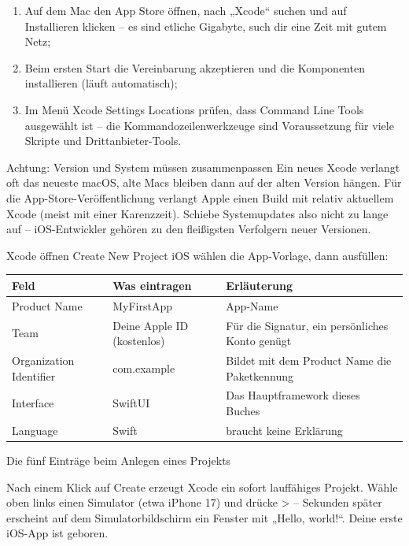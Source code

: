 \begin{enumerate}
  \item Auf dem Mac den App Store öffnen, nach „Xcode“ suchen und auf Installieren klicken – es sind etliche Gigabyte, such dir eine Zeit mit gutem Netz;
  \item Beim ersten Start die Vereinbarung akzeptieren und die Komponenten installieren (läuft automatisch);
  \item Im Menü Xcode Settings Locations prüfen, dass Command Line Tools ausgewählt ist – die Kommandozeilenwerkzeuge sind Voraussetzung für viele Skripte und Drittanbieter-Tools.
\end{enumerate}

\begin{tcbwarn}{Achtung: Version und System müssen zusammenpassen}
Ein neues Xcode verlangt oft das neueste macOS, alte Macs bleiben dann auf der alten Version hängen. Für die App-Store-Veröffentlichung verlangt Apple einen Build mit relativ aktuellem Xcode (meist mit einer Karenzzeit). Schiebe Systemupdates also nicht zu lange auf – iOS-Entwickler gehören zu den fleißigsten Verfolgern neuer Versionen.

\end{tcbwarn}


Xcode öffnen Create New Project iOS wählen die App-Vorlage, dann ausfüllen:

\begin{center}
\begin{tabularx}{\linewidth}{|X|X|X|}
\hline
\textbf{Feld} & \textbf{Was eintragen} & \textbf{Erläuterung} \tabularnewline
\hline
Product Name & MyFirstApp & App-Name \tabularnewline
Team & Deine Apple ID (kostenlos) & Für die Signatur, ein persönliches Konto genügt \tabularnewline
Organization Identifier & com.example & Bildet mit dem Product Name die Paketkennung \tabularnewline
Interface & SwiftUI & Das Hauptframework dieses Buches \tabularnewline
Language & Swift & braucht keine Erklärung \tabularnewline
\hline
\end{tabularx}
\end{center}

\begin{center}\small\color{gray}Die fünf Einträge beim Anlegen eines Projekts\end{center}

Nach einem Klick auf Create erzeugt Xcode ein sofort lauffähiges Projekt. Wähle oben links einen Simulator (etwa iPhone 17) und drücke > – Sekunden später erscheint auf dem Simulatorbildschirm ein Fenster mit „Hello, world!“. Deine erste iOS-App ist geboren.

